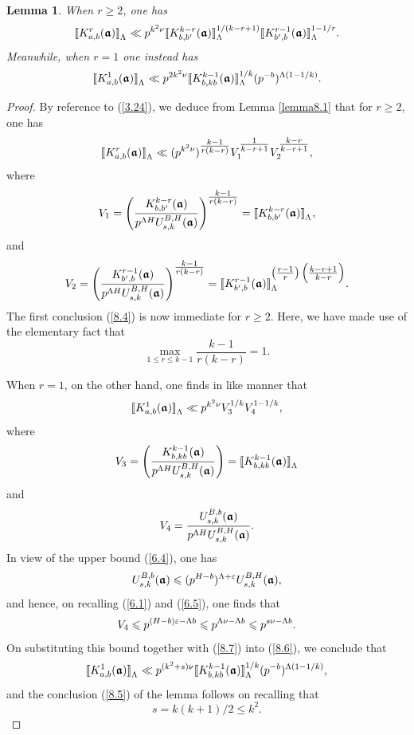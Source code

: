 \documentclass[12pt,reqno]{amsart}
\newtheorem{lemma}[theorem]{Lemma}
\theoremstyle{definition}
\theoremstyle{remark}
\numberwithin{equation}{section}
\def\eps{\varepsilon}
\def\le{\leqslant} \def\ge{\geqslant} \def\pleq{\preccurlyeq} \def\ple{\prec}
\newcommand{\rrbracketsub}[1]{\rrbracket_{\textstyle{_#1}}}
\begin{document}
\begin{lemma}\label{lemma8.2} When $r\ge 2$, one has
\begin{equation}\label{8.4}
\llbracket K_{a,b}^r(\bfgra)\rrbracketsub{\Lambda}\ll p^{k^2\nu}\llbracket 
K_{b,b^\prime }^{k-r}(\bfgra)\rrbracketsub{\Lam}^{1/(k-r+1)}
\llbracket K_{b^\prime,b}^{r-1}(\bfgra)\rrbracketsub{\Lam}^{1-1/r}.
\end{equation}
Meanwhile, when $r=1$ one instead has
\begin{equation}\label{8.5}
\llbracket K_{a,b}^1(\bfgra)\rrbracketsub{\Lam}\ll p^{2k^2\nu}\llbracket K_{b,kb}^{k-1}
(\bfgra)\rrbracketsub{\Lam}^{1/k}(p^{-b})^{\Lam (1-1/k)}.
\end{equation}
\end{lemma}

\begin{proof} By reference to (\ref{3.24}), we deduce from Lemma \ref{lemma8.1} that 
for $r\ge 2$, one has
$$\llbracket K_{a,b}^r(\bfgra)\rrbracketsub{\Lam}\ll 
(p^{k^2\nu})^{\textstyle{\frac{k-1}{r(k-r)}}}V_1^{\textstyle{\frac{1}{k-r+1}}}
V_2^{\textstyle{\frac{k-r}{k-r+1}}},$$
where
$$V_1=\left( \frac{K_{b,b^\prime}^{k-r}(\bfgra)}{p^{\Lam H}U_{s,k}^{B,H}(\bfgra)}
\right)^{\textstyle{\frac{k-1}{r(k-r)}}}=\llbracket K_{b,b^\prime}^{k-r}(\bfgra)
\rrbracketsub{\Lam},$$
and
$$V_2=\left( \frac{K_{b^\prime,b}^{r-1}(\bfgra)}{p^{\Lam H}U_{s,k}^{B,H}(\bfgra)}
\right)^{\textstyle{\frac{k-1}{r(k-r)}}}=\llbracket K_{b^\prime,b}^{r-1}(\bfgra)
\rrbracketsub{\Lam}^{\textstyle{\left(\frac{r-1}{r}\right) \left( \frac{k-r+1}{k-r}\right) }}.
$$
The first conclusion (\ref{8.4}) is now immediate for $r\ge 2$. Here, we have made use of 
the elementary fact that
$$\max_{1\le r\le k-1}\frac{k-1}{r(k-r)}=1.$$
\par

When $r=1$, on the other hand, one finds in like manner that
\begin{equation}\label{8.6}
\llbracket K_{a,b}^1(\bfgra)\rrbracketsub{\Lam} \ll p^{k^2\nu}V_3^{1/k}V_4^{1-1/k},
\end{equation}
where
\begin{equation}\label{8.7}
V_3=\left( \frac{K_{b,kb}^{k-1}(\bfgra)}{p^{\Lam H}U_{s,k}^{B,H}(\bfgra)}\right) 
=\llbracket K_{b,kb}^{k-1}(\bfgra)\rrbracketsub{\Lam}
\end{equation}
and
$$V_4=\frac{U_{s,k}^{B,b}({\boldsymbol {{\mathfrak a}}})}{p^{{\Lambda} H}U_{s,k}^{B,H}({\boldsymbol {{\mathfrak a}}})}.$$
In view of the upper bound (\ref{6.4}), one has
$$U_{s,k}^{B,b}(\bfgra)\le (p^{H-b})^{\Lam+\eps}U_{s,k}^{B,H}(\bfgra),$$
and hence, on recalling (\ref{6.1}) and (\ref{6.5}), one finds that
$$V_4\le p^{(H-b)\eps -\Lam b}\le p^{\Lam \nu -\Lam b}\le p^{s\nu-\Lam b}.$$
On substituting this bound together with (\ref{8.7}) into (\ref{8.6}), we conclude that
$$\llbracket K_{a,b}^1(\bfgra)\rrbracketsub{\Lam}\ll p^{(k^2+s)\nu}\llbracket 
K_{b,kb}^{k-1}(\bfgra)\rrbracketsub{\Lam}^{1/k}(p^{-b})^{\Lam (1-1/k)},$$
and the conclusion (\ref{8.5}) of the lemma follows on recalling that
$$s=k(k+1)/2\le k^2.$$
\end{proof}
\end{document}
